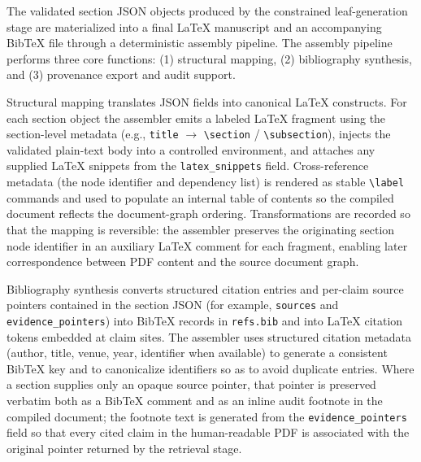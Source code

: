 The validated section JSON objects produced by the constrained leaf-generation stage are materialized into a final LaTeX manuscript and an accompanying BibTeX file through a deterministic assembly pipeline. The assembly pipeline performs three core functions: (1) structural mapping, (2) bibliography synthesis, and (3) provenance export and audit support.

Structural mapping translates JSON fields into canonical LaTeX constructs. For each section object the assembler emits a labeled LaTeX fragment using the section-level metadata (e.g., \texttt{title} $\rightarrow$ \verb|\section| / \verb|\subsection|), injects the validated plain-text body into a controlled environment, and attaches any supplied LaTeX snippets from the \texttt{latex\_snippets} field. Cross-reference metadata (the node identifier and dependency list) is rendered as stable \verb|\label| commands and used to populate an internal table of contents so the compiled document reflects the document-graph ordering. Transformations are recorded so that the mapping is reversible: the assembler preserves the originating section node identifier in an auxiliary LaTeX comment for each fragment, enabling later correspondence between PDF content and the source document graph.

Bibliography synthesis converts structured citation entries and per-claim source pointers contained in the section JSON (for example, \texttt{sources} and \texttt{evidence\_pointers}) into BibTeX records in \texttt{refs.bib} and into LaTeX citation tokens embedded at claim sites. The assembler uses structured citation metadata (author, title, venue, year, identifier when available) to generate a consistent BibTeX key and to canonicalize identifiers so as to avoid duplicate entries. Where a section supplies only an opaque source pointer, that pointer is preserved verbatim both as a BibTeX comment and as an inline audit footnote in the compiled document; the footnote text is generated from the \texttt{evidence\_pointers} field so that every cited claim in the human-readable PDF is associated with the original pointer returned by the retrieval stage.

